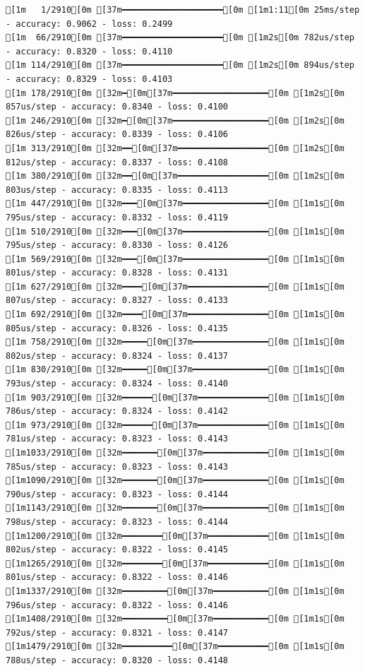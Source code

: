 \documentclass[
  letterpaper,
  DIV=11,
  numbers=noendperiod]{scrartcl}
\begin{document}
\begin{verbatim}
[1m   1/2910[0m [37m━━━━━━━━━━━━━━━━━━━━[0m [1m1:11[0m 25ms/step - accuracy: 0.9062 - loss: 0.2499
[1m  66/2910[0m [37m━━━━━━━━━━━━━━━━━━━━[0m [1m2s[0m 782us/step - accuracy: 0.8320 - loss: 0.4110 
[1m 114/2910[0m [37m━━━━━━━━━━━━━━━━━━━━[0m [1m2s[0m 894us/step - accuracy: 0.8329 - loss: 0.4103
[1m 178/2910[0m [32m━[0m[37m━━━━━━━━━━━━━━━━━━━[0m [1m2s[0m 857us/step - accuracy: 0.8340 - loss: 0.4100
[1m 246/2910[0m [32m━[0m[37m━━━━━━━━━━━━━━━━━━━[0m [1m2s[0m 826us/step - accuracy: 0.8339 - loss: 0.4106
[1m 313/2910[0m [32m━━[0m[37m━━━━━━━━━━━━━━━━━━[0m [1m2s[0m 812us/step - accuracy: 0.8337 - loss: 0.4108
[1m 380/2910[0m [32m━━[0m[37m━━━━━━━━━━━━━━━━━━[0m [1m2s[0m 803us/step - accuracy: 0.8335 - loss: 0.4113
[1m 447/2910[0m [32m━━━[0m[37m━━━━━━━━━━━━━━━━━[0m [1m1s[0m 795us/step - accuracy: 0.8332 - loss: 0.4119
[1m 510/2910[0m [32m━━━[0m[37m━━━━━━━━━━━━━━━━━[0m [1m1s[0m 795us/step - accuracy: 0.8330 - loss: 0.4126
[1m 569/2910[0m [32m━━━[0m[37m━━━━━━━━━━━━━━━━━[0m [1m1s[0m 801us/step - accuracy: 0.8328 - loss: 0.4131
[1m 627/2910[0m [32m━━━━[0m[37m━━━━━━━━━━━━━━━━[0m [1m1s[0m 807us/step - accuracy: 0.8327 - loss: 0.4133
[1m 692/2910[0m [32m━━━━[0m[37m━━━━━━━━━━━━━━━━[0m [1m1s[0m 805us/step - accuracy: 0.8326 - loss: 0.4135
[1m 758/2910[0m [32m━━━━━[0m[37m━━━━━━━━━━━━━━━[0m [1m1s[0m 802us/step - accuracy: 0.8324 - loss: 0.4137
[1m 830/2910[0m [32m━━━━━[0m[37m━━━━━━━━━━━━━━━[0m [1m1s[0m 793us/step - accuracy: 0.8324 - loss: 0.4140
[1m 903/2910[0m [32m━━━━━━[0m[37m━━━━━━━━━━━━━━[0m [1m1s[0m 786us/step - accuracy: 0.8324 - loss: 0.4142
[1m 973/2910[0m [32m━━━━━━[0m[37m━━━━━━━━━━━━━━[0m [1m1s[0m 781us/step - accuracy: 0.8323 - loss: 0.4143
[1m1033/2910[0m [32m━━━━━━━[0m[37m━━━━━━━━━━━━━[0m [1m1s[0m 785us/step - accuracy: 0.8323 - loss: 0.4143
[1m1090/2910[0m [32m━━━━━━━[0m[37m━━━━━━━━━━━━━[0m [1m1s[0m 790us/step - accuracy: 0.8323 - loss: 0.4144
[1m1143/2910[0m [32m━━━━━━━[0m[37m━━━━━━━━━━━━━[0m [1m1s[0m 798us/step - accuracy: 0.8323 - loss: 0.4144
[1m1200/2910[0m [32m━━━━━━━━[0m[37m━━━━━━━━━━━━[0m [1m1s[0m 802us/step - accuracy: 0.8322 - loss: 0.4145
[1m1265/2910[0m [32m━━━━━━━━[0m[37m━━━━━━━━━━━━[0m [1m1s[0m 801us/step - accuracy: 0.8322 - loss: 0.4146
[1m1337/2910[0m [32m━━━━━━━━━[0m[37m━━━━━━━━━━━[0m [1m1s[0m 796us/step - accuracy: 0.8322 - loss: 0.4146
[1m1408/2910[0m [32m━━━━━━━━━[0m[37m━━━━━━━━━━━[0m [1m1s[0m 792us/step - accuracy: 0.8321 - loss: 0.4147
[1m1479/2910[0m [32m━━━━━━━━━━[0m[37m━━━━━━━━━━[0m [1m1s[0m 788us/step - accuracy: 0.8320 - loss: 0.4148

\end{verbatim}
\end{document}
